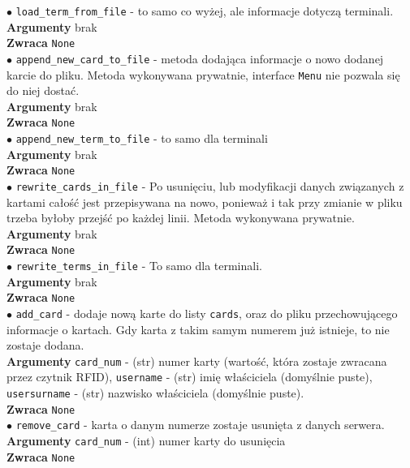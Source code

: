 \documentclass{article}
\begin{document}
$\bullet$ \texttt{load\_term\_from\_file} - to samo co wyżej, ale 
informacje dotyczą terminali. \\
\textbf{Argumenty} brak \\ \textbf{Zwraca} \texttt{None} \\

\newpage 
$\bullet$ \texttt{append\_new\_card\_to\_file} - metoda 
dodająca informacje o nowo dodanej karcie do pliku. Metoda wykonywana
prywatnie, interface \texttt{Menu} nie pozwala się do niej dostać. \\
\textbf{Argumenty} brak \\ \textbf{Zwraca} \texttt{None} \\

$\bullet$ \texttt{append\_new\_term\_to\_file} - to samo dla 
terminali \\
\textbf{Argumenty} brak \\ \textbf{Zwraca} \texttt{None} \\

$\bullet$ \texttt{rewrite\_cards\_in\_file} - Po usunięciu, lub
modyfikacji danych związanych z kartami całość jest przepisywana na
nowo, ponieważ i tak przy zmianie w pliku trzeba byłoby przejść 
po każdej linii. Metoda wykonywana prywatnie. \\
\textbf{Argumenty} brak \\ \textbf{Zwraca} \texttt{None} \\

$\bullet$ \texttt{rewrite\_terms\_in\_file} - To samo dla terminali. \\
\textbf{Argumenty} brak \\ \textbf{Zwraca} \texttt{None} \\

$\bullet$ \texttt{add\_card} - dodaje nową karte do listy 
\texttt{cards}, oraz do pliku przechowującego informacje o kartach. 
Gdy karta z takim samym numerem już istnieje, to nie zostaje 
dodana.  \\
\textbf{Argumenty} \texttt{card\_num} - (str) numer karty (wartość,
która zostaje zwracana przez czytnik RFID), \texttt{username} - 
(str) imię właściciela (domyślnie puste), \texttt{usersurname} - 
(str) nazwisko właściciela (domyślnie puste). \\
\textbf{Zwraca} \texttt{None} \\

$\bullet$ \texttt{remove\_card} - karta o danym numerze zostaje
usunięta z danych serwera. \\
\textbf{Argumenty} \texttt{card\_num} - (int) numer karty 
do usunięcia \\ 
\textbf{Zwraca} \texttt{None} \\
\end{document}
